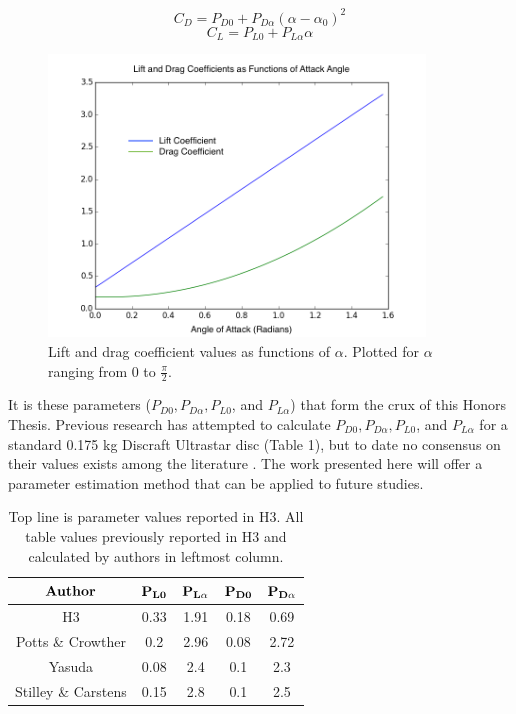 \documentclass[a4paper,12pt, oneside]{article}
\begin{document}
\begin{equation}
  C_D=P_{D0}+P_{D\alpha}(\alpha-\alpha_0)^2
\end{equation}
\begin{equation}
  C_L=P_{L0}+P_{L\alpha}\alpha
\end{equation}
\begin{figure}[H]
	\centering
	\includegraphics[width=10cm, height=7.5cm]{liftanddrag}
	\caption{Lift and drag coefficient values as functions of $\alpha.$ Plotted for $\alpha$ ranging from 0 to $\frac{\pi}{2}$.}
\end{figure}
It is these parameters ($P_{D0}, P_{D\alpha}, P_{L0}$, and $P_{L\alpha}$) that form the crux of this Honors Thesis. Previous research has attempted to calculate $P_{D0}, P_{D\alpha}, P_{L0}$, and $P_{L\alpha}$ for a standard 0.175 kg Discraft Ultrastar disc (Table 1), but to date no consensus on their values exists among the literature \cite{H3, pottsandcrowther2007, yasuda, stilleyandcarstens}. The work presented here will offer a parameter estimation method that can be applied to future studies.

\begin{table}[h]\label{tab:1}
\centering
\begin{tabular}{| c | c | c | c | c |}
\hline
$\bf{Author}$ & $\bf{P_{L0}}$ & $\bf{P_{L\alpha}}$ & $\bf{P_{D0}}$ & $\bf{P_{D\alpha}}$ \\ \hline
H3 & 0.33 & 1.91 & 0.18 & 0.69  \\ \hline
Potts \& Crowther & 0.2 & 2.96 & 0.08 & 2.72 \\ \hline
Yasuda & 0.08 & 2.4 & 0.1 & 2.3 \\ \hline
Stilley \& Carstens & 0.15 & 2.8 & 0.1 & 2.5 \\ \hline
\end{tabular}
\caption{Top line is parameter values reported in H3. All table values previously reported in H3 and calculated by authors in leftmost column.}
\end{table} 
\end{document}
